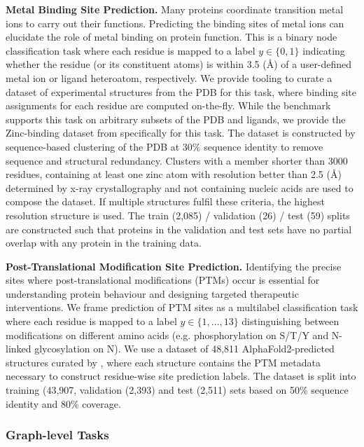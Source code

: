 \textbf{Metal Binding Site Prediction. } 
Many proteins coordinate transition metal ions to carry out their functions. Predicting the binding sites of metal ions can elucidate the role of metal binding on protein function.
This is a binary node classification task where each residue is mapped to a label $y \in \{0, 1\}$ indicating whether the residue (or its constituent atoms) is within 3.5 (\AA) of a user-defined metal ion or ligand heteroatom, respectively.
We provide tooling to curate a dataset of experimental structures from the PDB for this task, where binding site assignments for each residue are computed on-the-fly. While the benchmark supports this task on arbitrary subsets of the PDB and ligands, we provide the Zinc-binding dataset from \citet{Drr2023} specifically for this task. The dataset is constructed by sequence-based clustering of the PDB at 30\% sequence identity to remove sequence and structural redundancy. Clusters with a member shorter than 3000 residues, containing at least one zinc atom with resolution better than 2.5 (\AA) determined by x-ray crystallography and not containing nucleic acids are used to compose the dataset. If multiple structures fulfil these criteria, the highest resolution structure is used. The train (2,085) / validation (26) / test (59) splits are constructed such that proteins in the validation and test sets have no partial overlap with any protein in the training data.


\textbf{Post-Translational Modification Site Prediction. } 
Identifying the precise sites where post-translational modifications (PTMs) occur is essential for understanding protein behaviour and designing targeted therapeutic interventions.
We frame prediction of PTM sites as a multilabel classification task where each residue is mapped to a label $y \in \{1, \dots, 13\}$ distinguishing between modifications on different amino acids (e.g. phosphorylation on S/T/Y and N-linked glycosylation on N).
We use a dataset of 48,811 AlphaFold2-predicted structures curated by \citet{Yan2023}, where each structure contains the PTM metadata necessary to construct residue-wise site prediction labels. The dataset is split into training (43,907, validation (2,393) and test (2,511) sets based on 50\% sequence identity and 80\% coverage.

\subsubsection{Graph-level Tasks}

